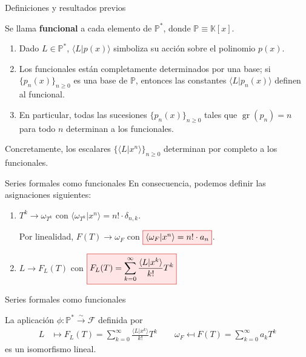 \documentclass{beamer}
\newenvironment{teorema}[1][]{
  \begin{tcolorbox}[colback=darkred!10, colframe=darkred!90, title=Teorema\ #1, fonttitle=\bfseries]
}{
  \end{tcolorbox}
}
\newenvironment{definicion}[1][]{
  \begin{tcolorbox}[colback=red!10, colframe=red!80!black, title=Definición\ #1, fonttitle=\bfseries]
}{
  \end{tcolorbox}
}
\newcommand{\rboxed}[1]{%
  \fcolorbox{red!80!black}{red!10}{$#1$}%
}
\newcommand{\F}{\mathscr{F}} %
\newcommand{\poly}{\mathbb{P}} %
\newcommand{\field}{\mathbb{K}} %
\DeclareMathOperator{\gr}{gr} %
\begin{document}
  \begin{frame}{Definiciones y resultados previos}
    \begin{definicion}
      Se llama \textbf{funcional} a cada elemento de $\poly^*$, donde $\poly \equiv \field[x]$.
    \end{definicion}

    \begin{enumerate}
      \item Dado $L \in \poly^*$, $\langle L | p(x) \rangle$ simboliza su acción sobre el polinomio $p(x)$.
      \item Los funcionales están completamente determinados por una base; si $\{p_n(x)\}_{n\geq0}$ es una base de $\poly$, entonces las constantes $\langle L | p_n(x) \rangle$ definen al funcional.
      \item En particular, todas las sucesiones $\{p_n(x)\}_{n\geq0}$ tales que $\gr(p_n) = n$ para todo $n$ determinan a los funcionales.
    \end{enumerate}
    \begin{block}{}
      Concretamente, los escalares $\{\langle L | x^n \rangle \}_{n \geq 0}$ determinan por completo a los funcionales.
    \end{block}
  \end{frame}

  \begin{frame}{Series formales como funcionales}
    En consecuencia, podemos definir las asignaciones siguientes:
    \begin{enumerate}
      \item $T^k \longrightarrow \omega_{T^k} \text{ con } \langle \omega_{T^k} | x^n \rangle = n! \cdot \delta_{n,k}$. 
      
      Por linealidad, $F(T) \longrightarrow \omega_{F}$ con $\rboxed{\langle \omega_F | x^n \rangle = n! \cdot a_n}$.
      \item $L \longrightarrow F_L(T)$ con $\rboxed{F_L(T) = \displaystyle \sum_{k=0}^\infty \frac{ \langle L | x^k \rangle}{k!} T^k }$
    \end{enumerate}
  \end{frame}

  \begin{frame}{Series formales como funcionales}
    \begin{teorema}[(isomorfismo canónico umbral)]
      La aplicación $\phi \colon  \poly^* \xrightarrow{\sim} \F$ definida por
    \begin{align*}
        L & \mapsto F_L(T) = \sum_{k=0}^\infty \frac{ \langle L | x^k \rangle}{k!} T^k \quad \quad \omega_F \mapsfrom F(T) = \sum_{k=0}^\infty a_k T^k
    \end{align*}
    es un isomorfismo lineal.
    \end{teorema}
  \end{frame}
\end{document}
